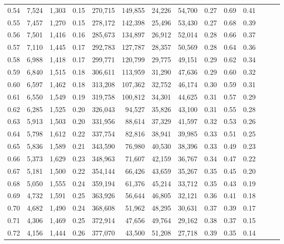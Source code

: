 \begin{tabular}{rrrrrrrrrrrrrr}
0.54 &  7,524 &  1,303 &  0.15 &  270,715 &  149,855 &  24,226 &  54,700 &  0.27 &  0.69 &      0.41 \\
0.55 &  7,457 &  1,270 &  0.15 &  278,172 &  142,398 &  25,496 &  53,430 &  0.27 &  0.68 &      0.39 \\
0.56 &  7,501 &  1,416 &  0.16 &  285,673 &  134,897 &  26,912 &  52,014 &  0.28 &  0.66 &      0.37 \\
0.57 &  7,110 &  1,445 &  0.17 &  292,783 &  127,787 &  28,357 &  50,569 &  0.28 &  0.64 &      0.36 \\
0.58 &  6,988 &  1,418 &  0.17 &  299,771 &  120,799 &  29,775 &  49,151 &  0.29 &  0.62 &      0.34 \\
0.59 &  6,840 &  1,515 &  0.18 &  306,611 &  113,959 &  31,290 &  47,636 &  0.29 &  0.60 &      0.32 \\
0.60 &  6,597 &  1,462 &  0.18 &  313,208 &  107,362 &  32,752 &  46,174 &  0.30 &  0.59 &      0.31 \\
0.61 &  6,550 &  1,549 &  0.19 &  319,758 &  100,812 &  34,301 &  44,625 &  0.31 &  0.57 &      0.29 \\
0.62 &  6,285 &  1,525 &  0.20 &  326,043 &   94,527 &  35,826 &  43,100 &  0.31 &  0.55 &      0.28 \\
0.63 &  5,913 &  1,503 &  0.20 &  331,956 &   88,614 &  37,329 &  41,597 &  0.32 &  0.53 &      0.26 \\
0.64 &  5,798 &  1,612 &  0.22 &  337,754 &   82,816 &  38,941 &  39,985 &  0.33 &  0.51 &      0.25 \\
0.65 &  5,836 &  1,589 &  0.21 &  343,590 &   76,980 &  40,530 &  38,396 &  0.33 &  0.49 &      0.23 \\
0.66 &  5,373 &  1,629 &  0.23 &  348,963 &   71,607 &  42,159 &  36,767 &  0.34 &  0.47 &      0.22 \\
0.67 &  5,181 &  1,500 &  0.22 &  354,144 &   66,426 &  43,659 &  35,267 &  0.35 &  0.45 &      0.20 \\
0.68 &  5,050 &  1,555 &  0.24 &  359,194 &   61,376 &  45,214 &  33,712 &  0.35 &  0.43 &      0.19 \\
0.69 &  4,732 &  1,591 &  0.25 &  363,926 &   56,644 &  46,805 &  32,121 &  0.36 &  0.41 &      0.18 \\
0.70 &  4,682 &  1,490 &  0.24 &  368,608 &   51,962 &  48,295 &  30,631 &  0.37 &  0.39 &      0.17 \\
0.71 &  4,306 &  1,469 &  0.25 &  372,914 &   47,656 &  49,764 &  29,162 &  0.38 &  0.37 &      0.15 \\
0.72 &  4,156 &  1,444 &  0.26 &  377,070 &   43,500 &  51,208 &  27,718 &  0.39 &  0.35 &      0.14 \\

\end{tabular}
